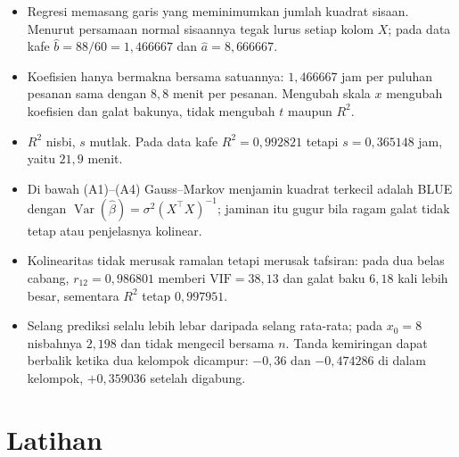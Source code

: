 \begin{ringkasan}
\begin{itemize}
  \item Regresi memasang garis yang meminimumkan jumlah kuadrat sisaan. Menurut
        persamaan normal sisaannya tegak lurus setiap kolom $X$; pada data kafe
        $\hat b=88/60=1{,}466667$ dan $\hat a=8{,}666667$.
  \item Koefisien hanya bermakna bersama satuannya: $1{,}466667$ jam per puluhan pesanan
        sama dengan $8{,}8$ menit per pesanan. Mengubah skala $x$ mengubah koefisien dan
        galat bakunya, tidak mengubah $t$ maupun $R^2$.
  \item $R^2$ nisbi, $s$ mutlak. Pada data kafe $R^2=0{,}992821$ tetapi
        $s=0{,}365148$ jam, yaitu $21{,}9$ menit.
  \item Di bawah (A1)--(A4) Gauss--Markov menjamin kuadrat terkecil adalah BLUE dengan
        $\operatorname{Var}(\hat\beta)=\sigma^2(X^{\top}X)^{-1}$; jaminan itu gugur bila
        ragam galat tidak tetap atau penjelasnya kolinear.
  \item Kolinearitas tidak merusak ramalan tetapi merusak tafsiran: pada dua belas cabang,
        $r_{12}=0{,}986801$ memberi $\mathrm{VIF}=38{,}13$ dan galat baku $6{,}18$ kali
        lebih besar, sementara $R^2$ tetap $0{,}997951$.
  \item Selang prediksi selalu lebih lebar daripada selang rata-rata; pada $x_0=8$
        nisbahnya $2{,}198$ dan tidak mengecil bersama $n$. Tanda kemiringan dapat
        berbalik ketika dua kelompok dicampur: $-0{,}36$ dan $-0{,}474286$ di dalam
        kelompok, $+0{,}359036$ setelah digabung.
\end{itemize}
\end{ringkasan}

\section{Latihan}

